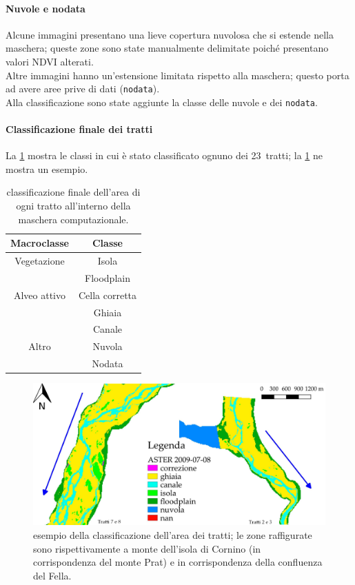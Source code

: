 \paragraph{Nuvole e nodata}
Alcune immagini presentano una lieve copertura nuvolosa che si estende nella maschera; queste zone sono state manualmente delimitate poiché presentano valori NDVI alterati.
\\
Altre immagini hanno un'estensione limitata rispetto alla maschera; questo porta ad avere aree prive di dati (\texttt{nodata}).
\\
Alla classificazione sono state aggiunte la classe delle nuvole e dei \texttt{nodata}.
%
%
\paragraph{Classificazione finale dei tratti}
La \cref{tab:class_tratti} mostra le classi in cui è stato classificato ognuno dei 23~tratti; la \cref{fig:class_is_fl} ne mostra un esempio.
%
\begin{table}[ht]
	\centering
	\begin{tabular}{
		c 
		c
		}
		\toprule
		\textbf{Macroclasse}	&	\textbf{Classe}	\\
		\midrule
		Vegetazione		&	Isola	\\
						&	Floodplain	\\
		Alveo attivo	&	Cella corretta	\\
						&	Ghiaia	\\
						&	Canale	\\
		Altro			&	Nuvola	\\
						&	Nodata	\\
		\bottomrule
	\end{tabular}
	\caption[classificazione dell'area dei tratti]{classificazione finale dell'area di ogni tratto all'interno della maschera computazionale.}
	\label{tab:class_tratti}
\end{table}
%
\begin{figure}[ht]
	\centering
	\includegraphics[width=\textwidth]{files/esempio_class_is_fl.jpeg}
	\caption[esempio della classificazione dell'area dei tratti]{esempio della classificazione dell'area dei tratti; le zone raffigurate sono rispettivamente a monte dell'isola di Cornino (in corrispondenza del monte Prat) e in corrispondenza della confluenza del Fella.}
	\label{fig:class_is_fl}
\end{figure}
%
%
%
